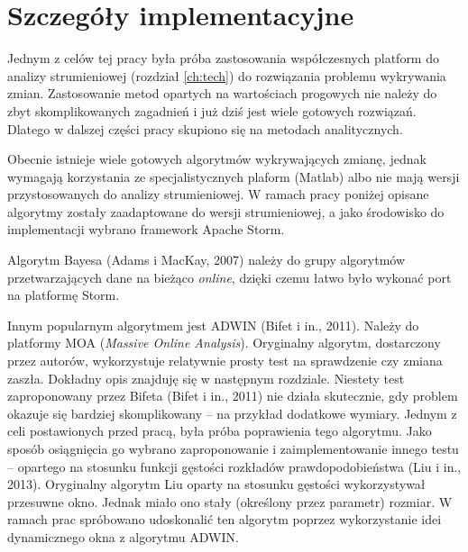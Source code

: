 \section{Szczegóły implementacyjne}
Jednym z celów tej pracy była próba zastosowania współczesnych platform do analizy strumieniowej (rozdział \ref{ch:tech})
do rozwiązania problemu wykrywania zmian.
Zastosowanie metod opartych na wartościach progowych nie należy do zbyt skomplikowanych zagadnień
i już dziś jest wiele gotowych rozwiązań.
Dlatego w dalszej części pracy skupiono się na metodach analitycznych.

Obecnie istnieje wiele gotowych algorytmów wykrywających zmianę,
jednak wymagają korzystania ze specjalistycznych plaform (Matlab) albo nie mają wersji
przystosowanych do analizy strumieniowej.
W ramach pracy poniżej opisane algorytmy zostały zaadaptowane do wersji strumieniowej,
a jako środowisko do implementacji wybrano framework Apache Storm.

Algorytm Bayesa (Adams i MacKay, 2007) należy do grupy algorytmów przetwarzających dane na bieżąco \textit{online},
dzięki czemu łatwo było wykonać port na platformę Storm.

Innym popularnym algorytmem jest ADWIN (Bifet i in., 2011).
Należy do platformy MOA (\textit{Massive Online Analysis}).
Oryginalny algorytm, dostarczony przez autorów,
wykorzystuje relatywnie prosty test na sprawdzenie czy zmiana zaszła.
Dokładny opis znajduję się w następnym rozdziale.
Niestety test zaproponowany przez Bifeta (Bifet i in., 2011) nie działa skutecznie,
gdy problem okazuje się bardziej skomplikowany -- na przykład dodatkowe wymiary.
Jednym z celi postawionych przed pracą,
była próba poprawienia tego algorytmu.
Jako sposób osiągnięcia go wybrano zaproponowanie i zaimplementowanie innego testu --
opartego na stosunku funkcji gęstości rozkładów prawdopodobieństwa (Liu i in., 2013).
Oryginalny algorytm Liu oparty na stosunku gęstości wykorzystywał przesuwne okno.
Jednak miało ono stały (określony przez parametr) rozmiar.
W ramach prac spróbowano udoskonalić ten algorytm poprzez wykorzystanie idei dynamicznego okna z algorytmu ADWIN.
